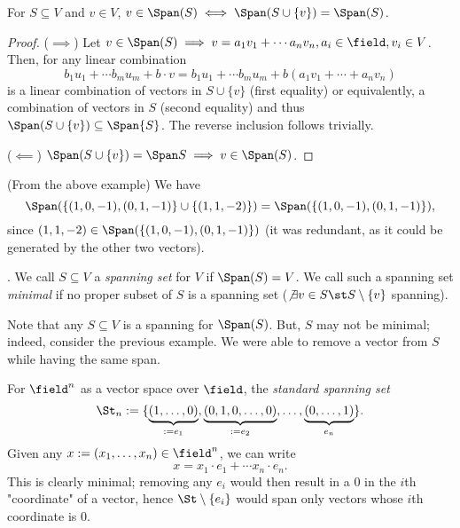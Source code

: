\begin{lemma}
    For $S \subseteq V$ and $v \in V$, $v \in \Span (S) \iff \Span (S \cup \{v\}) = \Span (S)$.
\end{lemma}
\begin{proof}
    ($\implies$) Let $v \in \Span (S) \implies v = a_1 v_1 + \cdots a_n v_n, a_i \in \field, v_i \in V$. Then, for any linear combination \[
    b_1 u_1 + \cdots b_m u_m + b \cdot v  = b_1 u_1 + \cdots b_m u_m + b(a_1 v_1 + \cdots + a_n v_n)   
    \]
    is a linear combination of vectors in $S \cup \{v\}$ (first equality) or equivalently, a combination of vectors in $S$ (second equality) and thus $\Span (S \cup \{v\}) \subseteq \Span{S}$. The reverse inclusion follows trivially.

    ($\impliedby$) $\Span (S \cup \{v\}) = \Span S \implies v \in \Span (S)$.
\end{proof}

\begin{example}
    (From the above example) We have \[
    \Span (\{(1, 0, -1), (0, 1, -1)\} \cup \{(1, 1, -2)\}) = \Span( \{(1, 0, -1), (0, 1, -1) \}),
    \]
    since $(1, 1, -2) \in \Span(\{(1, 0, -1), (0, 1, -1) \})$ (it was redundant, as it could be generated by the other two vectors).
\end{example}

\begin{definition}
     . We call $S \subseteq V$ a \emph{spanning set} for $V$ if $\Span (S) = V$. We call such a spanning set \emph{minimal} if no proper subset of $S$ is a spanning set ($\not \exists v \in S \st S \setminus \{v\}$ spanning).
\end{definition}

\begin{remark}
    Note that any $S \subseteq V$ is a spanning for $\Span (S)$. But, $S$ may not be minimal; indeed, consider the previous example. We were able to remove a vector from $S$ while having the same span.
\end{remark}

\begin{example}
    For $\field^n$ as a vector space over $\field$, the \emph{standard spanning set} $$\St_n := \{\underbrace{(1, \dots, 0)}_{:=e_1}, \underbrace{(0, 1, 0, \dots, 0)}_{:=e_2}, \dots, \underbrace{(0, \dots, 1)}_{e_n}\}.$$
    Given any $x := (x_1, \dots, x_n) \in \field^n$, we can write \[
        x = x_1 \cdot e_1 + \cdots x_n \cdot e_n.
    \]
    This is clearly minimal; removing any $e_i$ would then result in a $0$ in the $i$th "coordinate" of a vector, hence $\St \setminus\{e_i\}$ would span only vectors whose $i$th coordinate is $0$.
\end{example}

